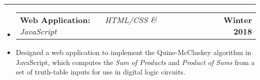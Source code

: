 \documentclass[10pt,letterpaper]{article}
\makeatletter
\newcommand{\header}[2]
{
	\begin{tabular*}{\linewidth}{l @{\extracolsep{\fill}} r}
		\hspace{-27pt} #1 & #2 \\
	\end{tabular*}
}
\makeatother
\begin{document}
\hrule

\begin{itemize}
	\item[]
		\header
			{	
				\textbf{Web Application: }
				\href{https://aashpointo.github.io/KmapWebsite/}{\emph{\underline{\smash{aashpointo.github.io/KmapWebsite}}}} \ \ \ \footnotesize \emph{HTML/CSS \& JavaScript}
				}
				{\textbf{Winter 2018}}
		\item
			Designed a web application to implement the Quine-McCluskey algorithm in JavaScript, which computes the \emph{Sum of Products} and \emph{Product of Sums} from a set of truth-table inputs for 
			use in digital logic circuits.

\end{itemize}
\end{document}
